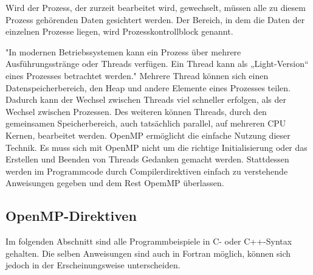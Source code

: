 \documentclass[../main.tex]{subfiles}
\begin{document}
Wird der Prozess, der zurzeit bearbeitet wird, gewechselt, müssen alle zu diesem Prozess gehörenden Daten gesichtert werden. Der Bereich, in dem die Daten der einzelnen Prozesse liegen, wird Prozesskontrollblock genannt.

"In modernen Betriebssystemen kann ein Prozess über mehrere Ausführungsstränge oder Threads verfügen. Ein Thread kann als „Light-Version“ eines Prozesses betrachtet werden." \cite{articleOpenMP}
Mehrere Thread können sich einen Datenspeicherbereich, den Heap und andere Elemente eines Prozesses teilen. Dadurch kann der Wechsel zwischen Threads viel schneller erfolgen, als der Wechsel zwischen Prozessen. Des weiteren können Threads, durch den gemeinsamen Speicherbereich, auch tatsächlich parallel, auf mehreren CPU Kernen, bearbeitet werden.
OpenMP ermöglicht die einfache Nutzung dieser Technik. Es muss sich mit OpenMP nicht um die richtige Initialisierung oder das Erstellen und Beenden von Threads Gedanken gemacht werden. Stattdessen werden im Programmcode durch Compilerdirektiven einfach zu verstehende Anweisungen gegeben und dem Rest OpemMP überlassen. \cite{articleOpenMP}

\subsection{OpenMP-Direktiven}

Im folgenden Abschnitt sind alle Programmbeispiele in C- oder C++-Syntax gehalten. Die selben Anweisungen sind auch in Fortran möglich, können sich jedoch in der Erscheinungsweise unterscheiden.
\end{document}
